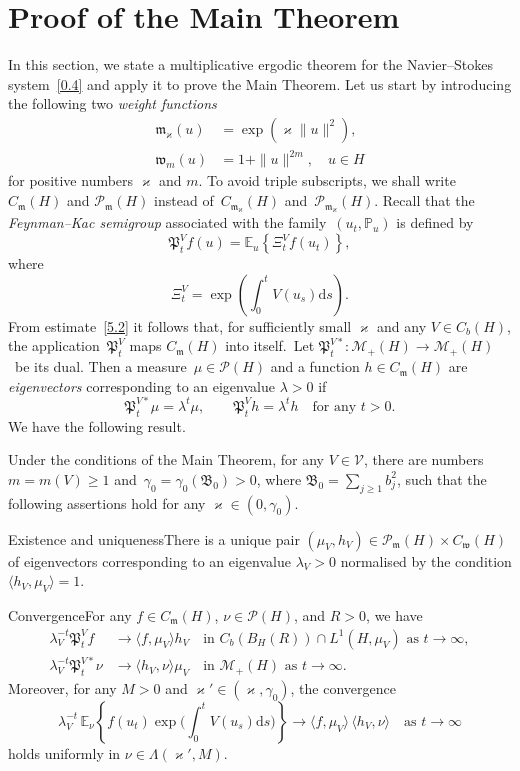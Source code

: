 \documentclass[AHL,Unicode,longabstracts]{cedram}
\newcommand{\IP}{{\mathbb P}}
\newcommand{\E}{{\mathbb E}}
\newcommand{\MM}{{\mathcal M}}
\newcommand{\PP}{{\mathcal P}}
\newcommand{\VV}{{\mathcal V}}
\newcommand{\vk}{{\varkappa}}
\newcommand{\la}{\lambda}
\newcommand{\wwww}{{\mathfrak w}}
\newcommand{\mm}{{\mathfrak m}}
\newcommand{\PPPP}{{\mathfrak P}}
\newcommand{\BBBB}{{\mathfrak B}}
\newcommand{\lag}{\langle}
\newcommand{\rag}{\rangle}
\newcommand{\dd}{\mathrm{d}}
\begin{document}
\section{Proof of the Main Theorem}\label{S:1}

In this section, we state a multiplicative ergodic theorem for the Navier--Stokes system~\eqref{0.4} and apply it to prove the Main Theorem. Let us start by introducing the following two \emph{weight functions}
\begin{align}
\mm_\vk(u)&=\exp(\vk \|u\|^2), \label{1.2}
\\
\wwww_m(u)&=1+\|u\|^{2m},\quad u\in H \label{1.1}
\end{align}
for positive numbers $\varkappa$ and $m$. To avoid triple subscripts, we shall write~$C_{\mm}(H)$ and $\PP_{\mm}(H)$ instead of~$C_{\mm_\vk}(H)$ and~$\PP_{\mm_\vk}(H)$. Recall that the \emph{Feynman--Kac semigroup} associated with the family~$(u_t,\IP_u)$ is defined by
\[
\PPPP_t^V f(u)=\E_u \left\{ \Xi^V_t f(u_t)\right\},
\]
where
\begin{equation}\label{ARM}
\Xi^V_t = \exp\left(\int_{0}^tV(u_s) \dd s\right).
\end{equation}
From estimate~\eqref{5.2} it follows that, for sufficiently small $\vk$ and any $V\in C_b(H)$, the application~$\PPPP_t^V$ maps $C_{\mm}(H)$ into itself.~Let $\PPPP_t^{V*}:\MM_+(H)\to \MM_+(H)$~be its dual. Then a measure~$\mu\in\PP(H)$ and a function $h\in C_\mm(H)$ are \emph{eigenvectors} corresponding to an eigenvalue $\la>0$ if
\[
\PPPP^{V*}_t\mu=\la^t \mu, \qquad \PPPP^V_t h=\la^t h\quad \text{for any~$t>0$}.
\]
We have the following result.

\begin{theo}\label{T:1.1}
Under the conditions of the Main Theorem, for any $V\in\VV$, there are numbers $m=m(V)\ge1$ and~$\gamma_0=\gamma_0(\BBBB_{0})>0$, where $\BBBB_{0}=\sum_{j\ge1}b_j^2$, such that the following assertions hold for any $\vk\in (0,\gamma_0).$

Existence and uniqueness\pointir There is a unique pair $(\mu_V,h_V)\!\in\! \PP_\mm(H)\times C_\wwww(H)$ of eigenvectors corresponding to an eigenvalue $\la_V>0$ normalised by the condition $\langle h_V,\mu_V\rangle=1$.

Convergence\pointir For any $f\in C_{\mm}(H)$, $\nu\in \PP(H)$, and $R>0$, we have
\begin{align}
\lambda_V^{-t}\PPPP_t^V f&\to\lag f,\mu_V\rag h_V \quad\text{in~$C_b(B_H(R))\cap L^1(H,\mu_V)$ as~$t\to\infty$}, \label{1.5}
\\
\lambda^{-t}_V\PPPP_t^{V*}\nu&\to\lag h_V,\nu\rag\mu_V
\quad\text{in~$\MM_+(H)$ as~$t\to\infty$}. \label{1.6}
\end{align}
Moreover, for any $M>0$ and $\vk'\in (\vk,\gamma_0)$, the convergence
\begin{equation}\label{1.7}
\lambda_V^{-t}\,\E_\nu\left\{f(u_t)\exp\bigg(\int_0^tV(u_s)\dd s\bigg)\right\}\to\langle f,\mu_V\rangle\,\langle h_V,\nu\rangle\quad \text{as } t\to\infty
\end{equation}
holds uniformly in $\nu\in\Lambda(\vk',M)$.
\end{theo}
\end{document}
